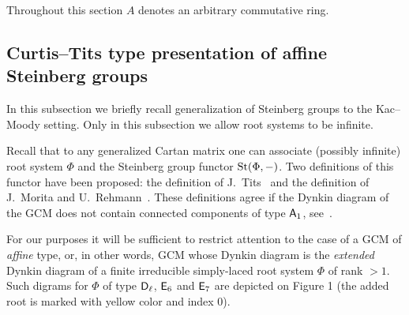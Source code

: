 Throughout this section $A$ denotes an arbitrary commutative ring.

\subsection{Curtis--Tits type presentation of affine Steinberg groups} \label{subsec:curtis-tits}
In this subsection we briefly recall generalization of Steinberg groups to the Kac--Moody setting.
Only in this subsection we allow root systems to be infinite.

Recall that to any generalized Cartan matrix one can associate (possibly infinite) root system $\Phi$ and the Steinberg group functor $\operatorname{St}(\Phi, -)$.
Two definitions of this functor have been proposed: the definition of J.~Tits~\cite[\S~3.6]{Ti87} and the definition of J.~Morita and U.~Rehmann~\cite[\S~2]{MR90}.
These definitions agree if the Dynkin diagram of the GCM does not contain connected components of type $\mathsf{A}_1$, see~\cite[\S~6]{A13}.

For our purposes it will be sufficient to restrict attention to the case of a GCM of \textit{affine} type, or, in other words, GCM whose Dynkin diagram is the \textit{extended} Dynkin diagram of a finite irreducible simply-laced root system $\Phi$ of rank $>1$.
Such digrams for $\Phi$ of type $\mathsf{D}_\ell$, $\mathsf{E}_6$ and $\mathsf{E}_7$ are depicted on Figure 1 (the added root is marked with yellow color and index $0$).

